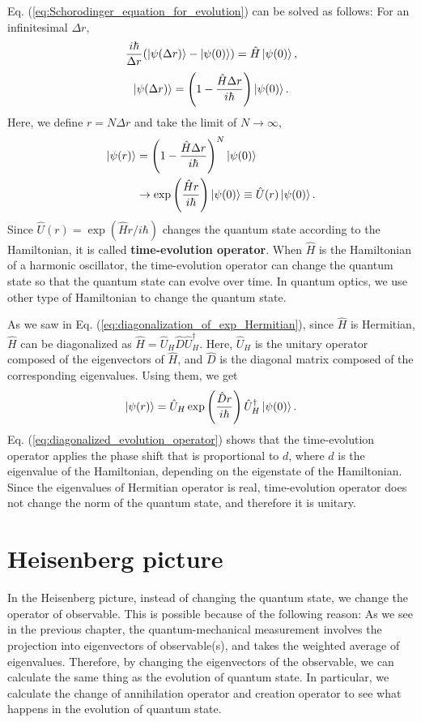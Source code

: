 \documentclass{book}
\begin{document}
Eq. (\ref{eq:Schorodinger_equation_for_evolution}) can be solved as follows:
For an infinitesimal $\Delta r$, 
\begin{equation}
  \frac{i\hbar}{\Delta r} (\ket{\psi(\Delta r)} - \ket{\psi(0)}) = \hat H \ket{\psi(0)},
\end{equation}
\begin{equation}
  \ket{\psi(\Delta r)} = \left(1 - \frac{\hat H\Delta r}{i\hbar}\right) \ket{\psi(0)}.
\end{equation}
Here, we define $r = N\Delta r$ and take the limit of $N \to \infty$,
\begin{equation}
\begin{aligned}
  \ket{\psi(r)} &= \left(1 - \frac{\hat H\Delta r}{i\hbar}\right)^N \ket{\psi(0)}\\
  &\to \exp\left(\frac{\hat Hr}{i\hbar}\right)\ket {\psi(0)} \equiv \hat U(r)\ket {\psi(0)}.
\end{aligned}
\end{equation}
Since $\hat U(r) = \exp(\hat Hr/i\hbar)$ changes the quantum state according to the Hamiltonian, it is called \textbf{time-evolution operator}. When $\hat H$ is the Hamiltonian of a harmonic oscillator, the time-evolution operator can change the quantum state so that the quantum state can evolve over time. In quantum optics, we use other type of Hamiltonian to change the quantum state. 

As we saw in Eq. (\ref{eq:diagonalization_of_exp_Hermitian}), since $\hat H$ is Hermitian, $\hat H$ can be diagonalized as $\hat H = \hat U_H\hat D\hat U_H^\dagger$. Here, $\hat U_H$ is the unitary operator composed of the eigenvectors of $\hat H$, and $\hat D$ is the diagonal matrix composed of the corresponding eigenvalues. Using them, we get
\begin{equation}
  \ket{\psi(r)} = \hat U_H\exp \left( \frac{\hat Dr}{i\hbar} \right)\hat U_H^\dagger \ket{\psi(0)}.
  \label{eq:diagonalized_evolution_operator}
\end{equation}
Eq. (\ref{eq:diagonalized_evolution_operator}) shows that the time-evolution operator applies the phase shift that is proportional to $d$, where $d$ is the eigenvalue of the Hamiltonian, depending on the eigenstate of the Hamiltonian. Since the eigenvalues of Hermitian operator is real, time-evolution operator does not change the norm of the quantum state, and therefore it is unitary.

\section{Heisenberg picture}
In the Heisenberg picture, instead of changing the quantum state, we change the operator of observable. This is possible because of the following reason: As we see in the previous chapter, the quantum-mechanical measurement involves the projection into eigenvectors of observable(s), and takes the weighted average of eigenvalues. Therefore, by changing the eigenvectors of the observable, we can calculate the same thing as the evolution of quantum state. In particular, we calculate the change of annihilation operator and creation operator to see what happens in the evolution of quantum state.
\end{document}
